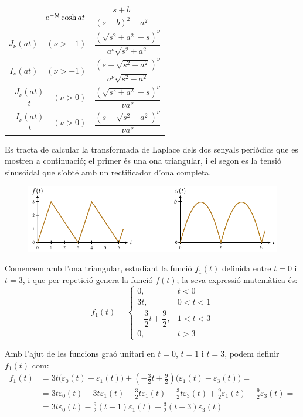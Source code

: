 \begin{longtable}{r<{\hspace{3em}}l}
   $\mathrm{e}^{-b t} \cosh a t$ & $ \dfrac{s+b}{(s+b)^2 - a^2}$\\[3ex]
   $J_\nu(a t)\quad(\nu>-1)$ & $\dfrac{\left(\sqrt{s^2+a^2}-s\right)^\nu}{a^\nu \sqrt{s^2+a^2}}$\\[2.4ex]
   $I_\nu(a t)\quad(\nu>-1)$ & $\dfrac{\left(s-\sqrt{s^2-a^2}\right)^\nu}{a^\nu \sqrt{s^2-a^2}}$\\[2.4ex]
   $\dfrac{J_\nu(a t)}{t}\quad(\nu>0)$ & $\dfrac{\left(\sqrt{s^2+a^2}-s\right)^\nu}{\nu a^\nu}$\\[2.4ex]
   $\dfrac{I_\nu(a t)}{t}\quad(\nu>0)$ & $\dfrac{\left(s-\sqrt{s^2-a^2}\right)^\nu}{\nu a^\nu}$\\[2.4ex]
    \bottomrule[1pt]
\end{longtable}

\begin{exemple}
    Es tracta de calcular la transformada de Laplace dels dos
    senyals peri\`{o}dics que es mostren a continuaci\'{o}; el primer \'{e}s una
    ona triangular, i el segon es la tensi\'{o} sinuso\"{\i}dal que s'obt\'{e} amb un
    rectificador d'ona completa.

\begin{figure}[h]
\centering
    \includegraphics{Imatges/Cap-Laplace-Exemple1.pdf}
\end{figure}

Comencem amb l'ona triangular, estudiant la funci\'{o} $f_1(t)$ definida
entre $t=0$ i $t=3$, i que per repetici\'{o} genera la funci\'{o} $f(t)$; la
seva expressi\'{o} matem\`{a}tica \'{e}s:
\[
    f_1(t) = \begin{cases} 0, & t < 0\\ 3t, & 0<t<1 \\ -\dfrac{3}{2}t
    +\dfrac{9}{2}, & 1 < t < 3 \\ 0, & t > 3 \end{cases}
\]

Amb l'ajut de les funcions gra\'{o} unitari en $t=0$, $t=1$ i $t=3$,
podem definir $f_1(t)$ com:
\[\begin{split}
    f_1(t) &= 3t \bigl(\varepsilon_0(t) - \varepsilon_1(t)\bigr) + \left(-\frac{3}{2}t
    +\frac{9}{2}\right) \bigl(\varepsilon_1(t) -
    \varepsilon_3(t)\bigr) = \\
    &=
    3t\varepsilon_0(t)-3t\varepsilon_1(t)-\frac{3}{2}t \varepsilon_1(t)
    +\frac{3}{2}t \varepsilon_3(t) +\frac{9}{2} \varepsilon_1(t)
    -\frac{9}{2} \varepsilon_3(t) = \\
    &=3t\varepsilon_0(t) -\frac{9}{2}(t-1)\varepsilon_1(t) +
    \frac{3}{2}(t-3)\varepsilon_3(t)
\end{split}\]


\end{exemple}
